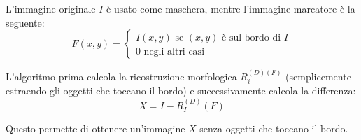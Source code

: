 L'immagine originale $I$ è usato come maschera, mentre l'immagine marcatore è la seguente:
$$
F(x, y) =
\begin{cases}
I(x, y) \text{ se } (x, y) \text{ è sul bordo di } I \\
0 \text{ negli altri casi }
\end{cases}
$$

L'algoritmo prima calcola la ricostruzione morfologica $R_i^{(D) (F)}$ (semplicemente estraendo gli oggetti che toccano il bordo) e successivamente calcola la differenza:
$$
X = I - R_I^{(D)} (F)
$$

Questo permette di ottenere un'immagine $X$ senza oggetti che toccano il bordo.